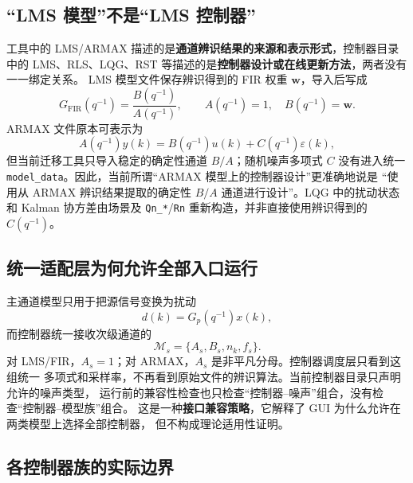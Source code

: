 \documentclass[UTF8,11pt,a4paper]{ctexart}
\begin{document}
\subsection{“LMS 模型”不是“LMS 控制器”}

工具中的 LMS/ARMAX 描述的是\textbf{通道辨识结果的来源和表示形式}，控制器目录中的
LMS、RLS、LQG、RST 等描述的是\textbf{控制器设计或在线更新方法}，两者没有一一绑定关系。
LMS 模型文件保存辨识得到的 FIR 权重 $\bm w$，导入后写成
\begin{equation}
G_{\mathrm{FIR}}(q^{-1})=\frac{B(q^{-1})}{A(q^{-1})},\qquad
A(q^{-1})=1,\quad B(q^{-1})=\bm w.
\end{equation}
ARMAX 文件原本可表示为
\begin{equation}
A(q^{-1})y(k)=B(q^{-1})u(k)+C(q^{-1})\varepsilon(k),
\end{equation}
但当前迁移工具只导入稳定的确定性通道 $B/A$；随机噪声多项式 $C$ 没有进入统一
\texttt{model\_data}。因此，当前所谓“ARMAX 模型上的控制器设计”更准确地说是
“使用从 ARMAX 辨识结果提取的确定性 $B/A$ 通道进行设计”。LQG 中的扰动状态和
Kalman 协方差由场景及 \texttt{Qn\_*}/\texttt{Rn} 重新构造，并非直接使用辨识得到的
$C(q^{-1})$。

\subsection{统一适配层为何允许全部入口运行}

主通道模型只用于把源信号变换为扰动
\begin{equation}
d(k)=G_p(q^{-1})x(k),
\end{equation}
而控制器统一接收次级通道的
\begin{equation}
\mathcal{M}_s=\{A_s,B_s,n_k,f_s\}.
\end{equation}
对 LMS/FIR，$A_s=1$；对 ARMAX，$A_s$ 是非平凡分母。控制器调度层只看到这组统一
多项式和采样率，不再看到原始文件的辨识算法。当前控制器目录只声明允许的噪声类型，
运行前的兼容性检查也只检查“控制器--噪声”组合，没有检查“控制器--模型族”组合。
这是一种\textbf{接口兼容策略}，它解释了 GUI 为什么允许在两类模型上选择全部控制器，
但不构成理论适用性证明。

\subsection{各控制器族的实际边界}
\end{document}
